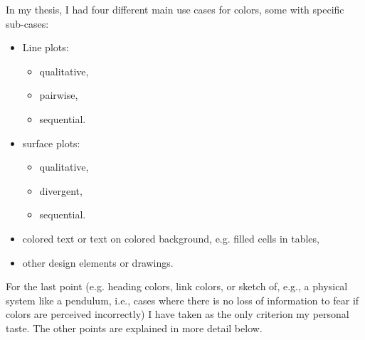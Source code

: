 In my thesis, I had four different main use cases for colors, some with specific sub-cases:
\begin{itemize}
	\item Line plots:
		\begin{itemize}
			\item qualitative,
			\item pairwise,
			\item sequential. 
		\end{itemize}
	\item surface plots:
		\begin{itemize}
			\item qualitative,
			\item divergent,
			\item sequential. 
		\end{itemize}
	\item colored text or text on colored background, e.g. filled cells in tables,
	\item other design elements or drawings.
\end{itemize}
For the last point (e.g. heading colors, link colors, or sketch of, e.g., a physical system like a pendulum, i.e., cases where there is no loss of information to fear if colors are perceived incorrectly) I have taken as the only criterion my personal taste. The other points are explained in more detail below.

